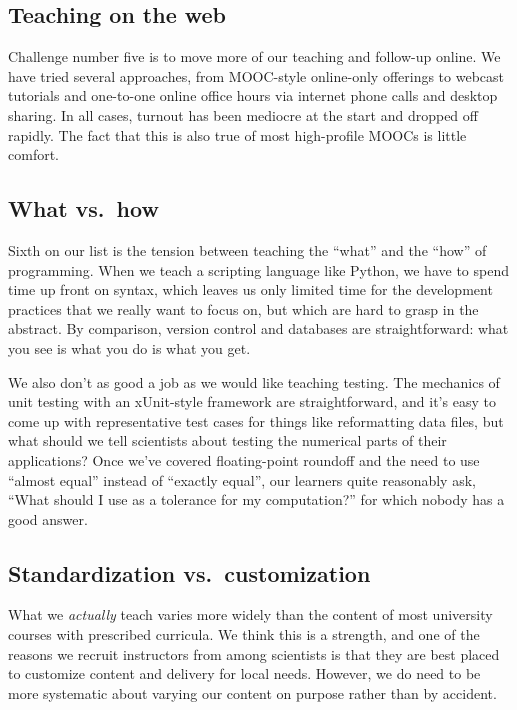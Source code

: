 \documentclass[10pt,a4paper,twocolumn]{article}
\begin{document}
\subsection*{Teaching on the web}

Challenge number five is to move more of our teaching and follow-up
online. We have tried several approaches, from MOOC-style online-only
offerings to webcast tutorials and one-to-one online office hours via
internet phone calls and desktop sharing. In all cases, turnout has
been mediocre at the start and dropped off rapidly. The fact that this
is also true of most high-profile MOOCs is little comfort.

\subsection*{What vs.~how}

Sixth on our list is the tension between teaching the ``what'' and the
``how'' of programming. When we teach a scripting language like Python,
we have to spend time up front on syntax, which leaves us only limited
time for the development practices that we really want to focus on, but
which are hard to grasp in the abstract. By comparison, version control
and databases are straightforward: what you see is what you do is what
you get.

We also don't as good a job as we would like teaching testing. The
mechanics of unit testing with an xUnit-style framework are
straightforward, and it's easy to come up with representative test cases
for things like reformatting data files, but what should we tell
scientists about testing the numerical parts of their applications? Once
we've covered floating-point roundoff and the need to use ``almost
equal'' instead of ``exactly equal'', our learners quite reasonably ask,
``What should I use as a tolerance for my computation?'' for which
nobody has a good answer.

\subsection*{Standardization vs.~customization}

What we \emph{actually} teach varies more widely than the content of
most university courses with prescribed curricula. We think this is a
strength, and one of the reasons we recruit instructors from among
scientists is that they are best placed to customize content and
delivery for local needs. However, we do need to be more systematic
about varying our content on purpose rather than by accident.
\end{document}
